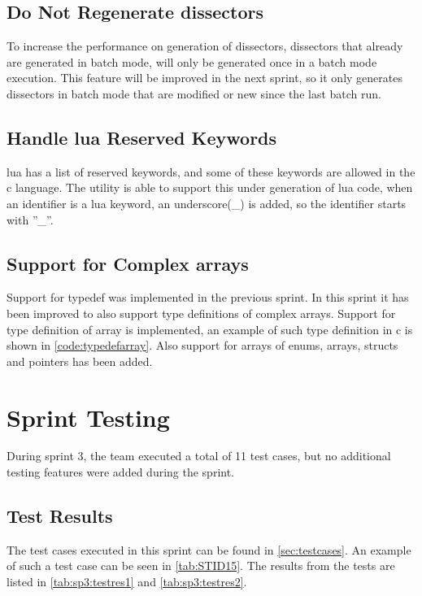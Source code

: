 \subsection{Do Not Regenerate \glspl{dissector}}
To increase the performance on generation of \glspl{dissector}, \glspl{dissector} that 
already are generated in \gls{batch mode}, will only be generated once in a batch 
mode execution. This feature will be improved in the next sprint, so it only 
generates \glspl{dissector} in \gls{batch mode} that are modified or new since the last 
batch run.

\subsection{Handle \Gls{lua} Reserved Keywords}
\Gls{lua} has a list of reserved keywords, and some of these keywords are allowed in 
the \Gls{c} language. The \gls{utility} is able to support this under generation of \Gls{lua} 
code, when an identifier is a lua keyword, an underscore(\_) is added, so the 
identifier starts with ''\_''.

\subsection{Support for Complex \Glspl{array}}
Support for typedef was implemented in the previous sprint. In this sprint it 
has been improved to also support type definitions of complex \glspl{array}. Support 
for type definition of array is implemented, an example of such type 
definition in \Gls{c} is shown in \autoref{code:typedefarray}. Also support for 
\glspl{array} of \glspl{enum}, \glspl{array}, \glspl{struct} and pointers has been added.




\section{Sprint Testing}
\label{sec:sp3:test}
During sprint 3, the team executed a total of 11 test cases, but no additional testing features were added during the sprint. 

\subsection{Test Results}
The test cases executed in this sprint can be found in \autoref{sec:testcases}. An example of such a test case can be seen in \autoref{tab:STID15}. The results from the tests are listed in \autoref{tab:sp3:testres1} and \autoref{tab:sp3:testres2}.

